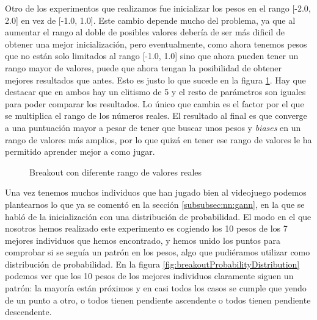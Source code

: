 Otro de los experimentos que realizamos fue inicializar los pesos en el rango [-2.0, 2.0] en vez de [-1.0, 1.0]. Este cambio depende mucho del problema, ya que al aumentar el rango al doble de posibles valores debería de ser más dificil de obtener una mejor inicialización, pero eventualmente, como ahora tenemos pesos que no están solo limitados al rango [-1.0, 1.0] sino que ahora pueden tener un rango mayor de valores, puede que ahora tengan la posibilidad de obtener mejores resultados que antes. Esto es justo lo que sucede en la figura \ref{fig:breakoutWeightsFactor2}. Hay que destacar que en ambos hay un elitismo de 5 y el resto de parámetros son iguales para poder comparar los resultados. Lo único que cambia es el factor por el que se multiplica el rango de los números reales. El resultado al final es que converge a una puntuación mayor a pesar de tener que buscar unos pesos y \textit{biases} en un rango de valores más amplios, por lo que quizá en tener ese rango de valores le ha permitido aprender mejor a como jugar.

\begin{figure}[!h]
    \centering
    
    
    \caption{Breakout con diferente rango de valores reales}
    \label{fig:breakoutWeightsFactor2}
\end{figure}

Una vez tenemos muchos individuos que han jugado bien al videojuego podemos plantearnos lo que ya se comentó en la sección \ref{subsubsec:nn:gann}, en la que se habló de la inicialización con una distribución de probabilidad. El modo en el que nosotros hemos realizado este experimento es cogiendo los 10 pesos de los 7 mejores individuos que hemos encontrado, y hemos unido los puntos para comprobar si se seguía un patrón en los pesos, algo que pudiéramos utilizar como distribución de probabilidad. En la figura \ref{fig:breakoutProbabilityDistribution} podemos ver que los 10 pesos de los mejores individuos claramente siguen un patrón: la mayoría están próximos y en casi todos los casos se cumple que yendo de un punto a otro, o todos tienen pendiente ascendente o todos tienen pendiente descendente.

